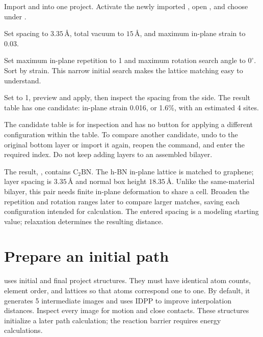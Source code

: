 \begin{steps}
  \item Import  and  into one project. Activate the newly imported , open , and choose  under .
  \item Set spacing to $3.35\,\text{\AA}$, total vacuum to $15\,\text{\AA}$, and maximum in-plane strain to 0.03.
  \item Set maximum in-plane repetition to 1 and maximum rotation search angle to $0^\circ$. Sort by strain. This narrow initial search makes the lattice matching easy to understand.
  \item Set  to 1, preview and apply, then inspect the spacing from the side. The result table has one candidate: in-plane strain 0.016, or 1.6\%, with an estimated 4 sites.
\end{steps}

The candidate table is for inspection and has no button for applying a different configuration within the table. To compare another candidate, undo to the original bottom layer or import it again, reopen the command, and enter the required index. Do not keep adding layers to an assembled bilayer.

The result, , contains $\mathrm{C_2BN}$. The h-BN in-plane lattice is matched to graphene; layer spacing is $3.35\,\text{\AA}$ and normal box height $18.35\,\text{\AA}$. Unlike the same-material bilayer, this pair needs finite in-plane deformation to share a cell. Broaden the repetition and rotation ranges later to compare larger matches, saving each configuration intended for calculation. The entered spacing is a modeling starting value; relaxation determines the resulting distance.



\section{Prepare an initial  path}

 uses initial and final project structures. They must have identical atom counts, element order, and lattices so that atoms correspond one to one. By default, it generates 5 intermediate images and uses IDPP to improve interpolation distances. Inspect every image for motion and close contacts. These structures initialize a later path calculation; the reaction barrier requires energy calculations.

